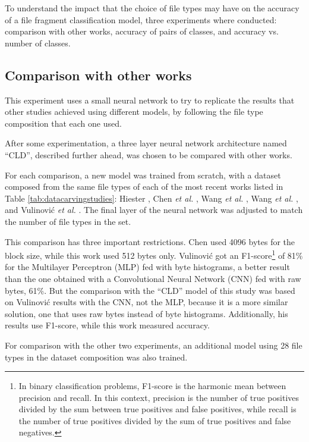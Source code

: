 To understand the impact that the choice of file types may have on the accuracy of a file fragment classification model, three experiments where conducted: comparison with other works, accuracy of pairs of classes, and accuracy vs. number of classes. 

\subsection{Comparison with other works}

This experiment uses a small neural network to try to replicate the results that other studies achieved using different models, by following the file type composition that each one used.

After some experimentation, a three layer neural network architecture named ``CLD'', described further ahead, was chosen to be compared with other works.

For each comparison, a new model was trained from scratch, with a dataset composed from the same file types of each of the most recent works listed in Table \ref{tab:datacarvingstudies}: 
Hiester \cite{hiester_file_2018}, 
Chen \textit{et al.} \cite{chen_file_2018},
Wang \textit{et al.} \cite{wang_sparse_2018},
Wang \textit{et al.} \cite{wang_file_2018},
and
Vulinović \textit{et al.} \cite{vulinovic_neural_2019}.
The final layer of the neural network was adjusted to match the number of file types in the set.

This comparison has three important restrictions.
Chen used 4096 bytes for the block size, while this work used 512 bytes only.
Vulinović got an F1-score\footnote{
    In binary classification problems, F1-score is the harmonic mean between precision and recall. In this context, precision is the number of true positives divided by the sum between true positives and false positives, while recall is the number of true positives divided by the sum of true positives and false negatives.
} of 81\% for the Multilayer Perceptron (MLP) fed with byte histograms, a better result than the one obtained with a Convolutional Neural Network (CNN) fed with raw bytes, 61\%. But the comparison with the ``CLD'' model of this study was based on Vulinović results with the CNN, not the MLP, because it is a more similar solution, one that uses raw bytes instead of byte histograms. Additionally, his results use F1-score, while this work measured accuracy. 

For comparison with the other two experiments, an additional model using 28 file types in the dataset composition was also trained.

